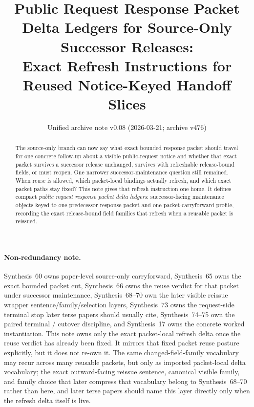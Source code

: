 \documentclass[11pt]{article}
\title{Public Request Response Packet Delta Ledgers for Source-Only Successor Releases:\\[0.5ex]
\large Exact Refresh Instructions for Reused Notice-Keyed Handoff Slices}
\author{}
\date{Unified archive note v0.08 (2026-03-21; archive v476)}
\begin{document}
\maketitle

\begin{abstract}
The source-only branch can now say what exact bounded response packet should travel for one concrete follow-up about a visible public-request notice and whether that exact packet survives a successor release unchanged, survives with refreshable release-bound fields, or must reopen.
One narrower successor-maintenance question still remained.
When reuse is allowed, which packet-local bindings actually refresh, and which exact packet paths stay fixed?
This note gives that refresh instruction one home.
It defines compact \emph{public request response packet delta ledgers}: successor-facing maintenance objects keyed to one predecessor response packet and one packet-carryforward profile, recording the exact release-bound field families that refresh when a reusable packet is reissued.
\end{abstract}

\paragraph{Non-redundancy note.}
Synthesis~60 owns paper-level source-only carryforward, Synthesis~65 owns the exact bounded packet cut, Synthesis~66 owns the reuse verdict for that packet under successor maintenance, Synthesis~68--70 own the later visible reissue wrapper sentence/family/selection layers, Synthesis~73 owns the request-side terminal stop later terse papers should usually cite, Synthesis~74--75 own the paired terminal / cutover discipline, and Synthesis~17 owns the concrete worked instantiation.\cite{series:publicrequestcarryforward,series:publicrequestresponsepackets,series:publicrequestresponsepacketcarryforward,series:publicrequestresponsepacketrefreshnotices,series:publicrequestresponsepacketrefreshnormalforms,series:publicrequestresponsepacketrefreshselections,series:publicrequestresponsepacketrefreshresponsepacketclosureverdicts,series:pairedterminalcitationdiscipline,series:pairedterminalcutoverrule,series:workedexample}
This note owns only the exact packet-local refresh delta once the reuse verdict has already been fixed. It mirrors that fixed packet reuse posture explicitly, but it does not re-own it. The same changed-field-family vocabulary may recur across many reusable packets, but only as imported packet-local delta vocabulary; the exact outward-facing reissue sentence, canonical visible family, and family choice that later compress that vocabulary belong to Synthesis~68--70 rather than here, and later terse papers should name this layer directly only when the refresh delta itself is live.
\end{document}
